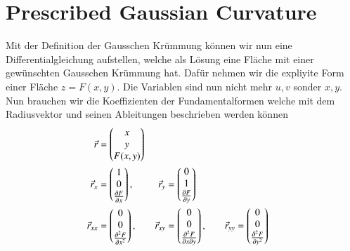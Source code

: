 %
%
%
%
\section{Prescribed Gaussian Curvature
\label{mongeampere:section:teil2}}
Mit der Definition der Gausschen Krümmung können wir nun eine Differentialgleichung aufstellen,
welche als Lösung eine Fläche mit einer gewünschten Gausschen Krümmung hat.
Dafür nehmen wir die expliyite Form einer Fläche $z = F(x,y)$.
Die Variablen sind nun nicht mehr $u, v$ sonder $x, y$.
Nun brauchen wir die Koeffizienten der Fundamentalformen welche mit dem Radiusvektor und seinen Ableitungen 
beschrieben werden können
\begin{align}
  \vec r &= \begin{pmatrix}
   x \\
   y \\
   F(x, y)
 \end{pmatrix} \\
    \vec r_x &= \begin{pmatrix}
      1 \\
      0 \\
      \pdv{F}{x}
    \end{pmatrix},
      \quad &
    \vec r_y &= \begin{pmatrix}
      0 \\
      1 \\
      \pdv{F}{y}
    \end{pmatrix}\\
      \vec r_{xx} &= \begin{pmatrix}
      0 \\
      0 \\
      \pdv[2]{F}{x}
    \end{pmatrix},
    \quad &
    \vec r_{xy} &= \begin{pmatrix}
      0 \\
      0 \\
      \pdv{F}{x}{y}
    \end{pmatrix},
      \quad &
    \vec r_{yy} &= \begin{pmatrix}
      0 \\
      0 \\
      \pdv[2]{F}{y}
    \end{pmatrix}\\
\end{align}
